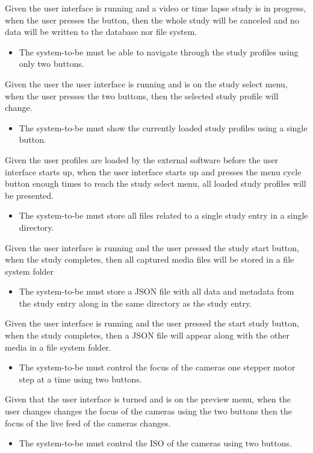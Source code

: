 Given the user interface is running and a video or time lapse study is in progress, when the user presses the button, then the whole study will be canceled and no data will be written to the database nor file system.
\begin{itemize}
	\item The system-to-be must be able to navigate through the study profiles using only two buttons.
\end{itemize}
Given the user the user interface is running and is on the study select menu, when the user presses the two buttons, then the selected study profile will change.
\begin{itemize}
	\item The system-to-be must show the currently loaded study profiles using a single button.
\end{itemize}
Given the user profiles are loaded by the external software before the user interface starts up, when the user interface starts up and presses the menu cycle button enough times to reach the study select menu, all loaded study profiles will be presented.
\begin{itemize}
	\item The system-to-be must store all files related to a single study entry in a single directory.
\end{itemize}
Given the user interface is running and the user pressed the study start button, when the study completes, then all captured media files will be stored in a file system folder
\begin{itemize}
	\item The system-to-be must store a JSON file with all data and metadata from the study entry along in the same directory as the study entry.
\end{itemize}
Given the user interface is running and the user pressed the start study button, when the study completes, then a JSON file will appear along with the other media in a file system folder.
\begin{itemize}
	\item The system-to-be must control the focus of the cameras one stepper motor step at a time using two buttons.
\end{itemize}
Given that the user interface is turned and is on the preview menu, when the user changes changes the focus of the cameras using the two buttons then the focus of the live feed of the cameras changes.
\begin{itemize}
	\item The system-to-be must control the ISO of the cameras using two buttons.
\end{itemize}
